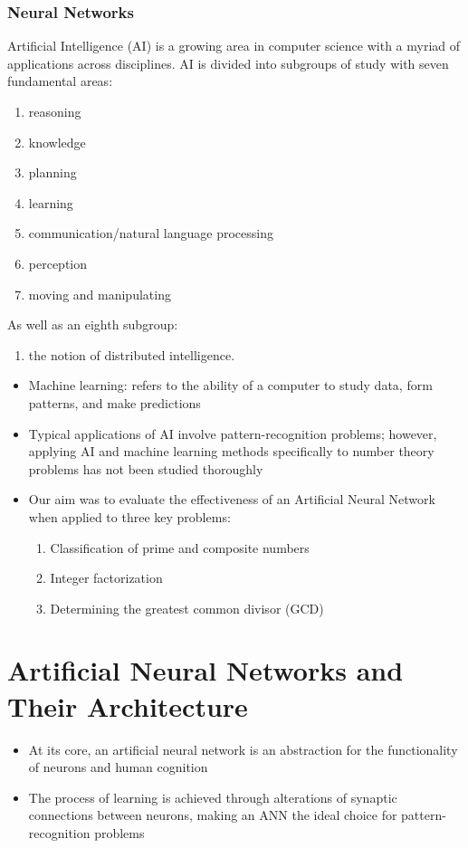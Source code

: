 \documentclass{beamer}
\begin{document}
\begin{frame}
\frametitle{Neural Networks}

Artificial Intelligence (AI) is a growing area in computer science with a myriad of applications across disciplines.  AI is divided into subgroups of study with seven fundamental areas:
\begin{enumerate}
\item reasoning
\item knowledge
\item planning
\item learning
\item communication/natural language processing
\item perception
\item moving and manipulating
\end{enumerate}
As well as an eighth subgroup:
\begin{enumerate}[8.]
\item the notion of distributed intelligence.
\end{enumerate}
\end{frame}

\begin{frame}
\begin{itemize}
\item Machine learning: refers to the ability of a computer to study data, form patterns, and make predictions
\item Typical applications of AI involve pattern-recognition problems; however, applying AI and machine learning methods specifically to number theory problems has not been studied thoroughly
\item Our aim was to evaluate the effectiveness of an Artificial Neural Network when applied to three key problems:
\begin{enumerate}
\item Classification of prime and composite numbers
\item Integer factorization
\item Determining the greatest common divisor (GCD)
\end{enumerate}
\end{itemize}
\end{frame}

\section{Artificial Neural Networks and Their Architecture}
\begin{frame}
\begin{itemize}

\item At its core, an artificial neural network is an abstraction for the functionality of neurons and human cognition
\item The process of learning is achieved through alterations of synaptic connections between neurons, making an ANN the ideal choice for pattern-recognition problems
\end{itemize}
\end{frame}
\end{document}
